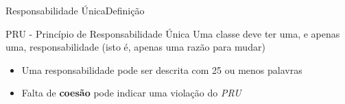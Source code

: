 \documentclass[10pt]{beamer}
\begin{document}

\begin{frame}{Responsabilidade Única}{Definição}

\begin{block}{PRU - Princípio de Responsabilidade Única}
Uma classe deve ter uma, e apenas uma, responsabilidade (isto é, apenas uma razão para mudar)
\end{block}

\begin{itemize}
  \item Uma responsabilidade pode ser descrita com 25 ou menos palavras
  \item Falta de \textbf{coesão} pode indicar uma violação do \textit{PRU}
\end{itemize}

\end{frame}

\end{document}
